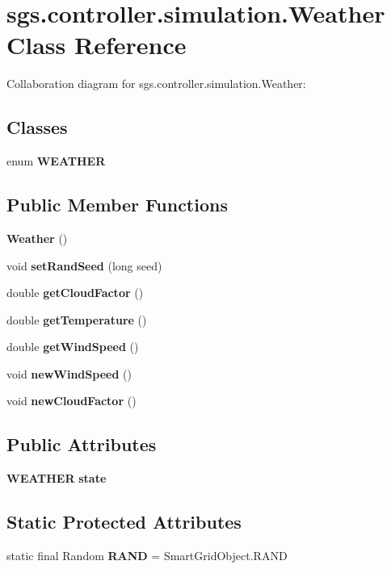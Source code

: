 \section{sgs.\-controller.\-simulation.\-Weather Class Reference}
\label{classsgs_1_1controller_1_1simulation_1_1_weather}


Collaboration diagram for sgs.\-controller.\-simulation.\-Weather\-:
\subsection*{Classes}
\begin{DoxyCompactItemize}
\item 
enum {\bf W\-E\-A\-T\-H\-E\-R}
\end{DoxyCompactItemize}
\subsection*{Public Member Functions}
\begin{DoxyCompactItemize}
\item 
{\bf Weather} ()
\item 
void {\bf set\-Rand\-Seed} (long seed)
\item 
double {\bf get\-Cloud\-Factor} ()
\item 
double {\bf get\-Temperature} ()
\item 
double {\bf get\-Wind\-Speed} ()
\item 
void {\bf new\-Wind\-Speed} ()
\item 
void {\bf new\-Cloud\-Factor} ()
\end{DoxyCompactItemize}
\subsection*{Public Attributes}
\begin{DoxyCompactItemize}
\item 
{\bf W\-E\-A\-T\-H\-E\-R} {\bf state}
\end{DoxyCompactItemize}
\subsection*{Static Protected Attributes}
\begin{DoxyCompactItemize}
\item 
static final Random {\bf R\-A\-N\-D} = Smart\-Grid\-Object.\-R\-A\-N\-D
\end{DoxyCompactItemize}


